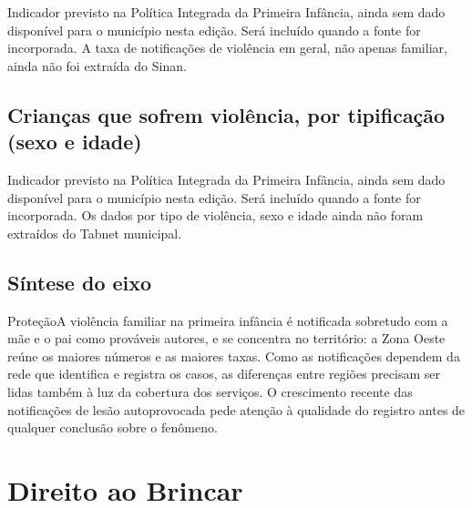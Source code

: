 \begin{pendente}Indicador previsto na Política Integrada da Primeira Infância, ainda sem dado disponível para o município nesta edição. Será incluído quando a fonte for incorporada. A taxa de notificações de violência em geral, não apenas familiar, ainda não foi extraída do Sinan.\end{pendente}

\section{Crianças que sofrem violência, por tipificação (sexo e idade)}

\begin{pendente}Indicador previsto na Política Integrada da Primeira Infância, ainda sem dado disponível para o município nesta edição. Será incluído quando a fonte for incorporada. Os dados por tipo de violência, sexo e idade ainda não foram extraídos do Tabnet municipal.\end{pendente}

\section{Síntese do eixo}

\begin{sintese}{Proteção}A violência familiar na primeira infância é notificada sobretudo com a mãe e o pai como prováveis autores, e se concentra no território: a Zona Oeste reúne os maiores números e as maiores taxas. Como as notificações dependem da rede que identifica e registra os casos, as diferenças entre regiões precisam ser lidas também à luz da cobertura dos serviços. O crescimento recente das notificações de lesão autoprovocada pede atenção à qualidade do registro antes de qualquer conclusão sobre o fenômeno.\end{sintese}


\chapter{Direito ao Brincar}\label{cap:eixo-5}

